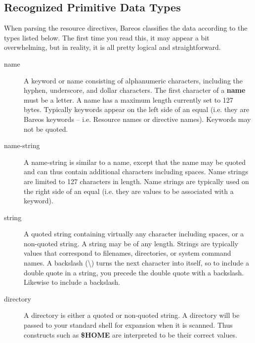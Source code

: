 \subsection{Recognized Primitive Data Types}
\label{DataTypes}

When parsing the resource directives, Bareos classifies the data according to
the types listed below. The first time you read this, it may appear a bit
overwhelming, but in reality, it is all pretty logical and straightforward.

\begin{description}

\item [name]
   A keyword or name consisting of alphanumeric characters, including the
hyphen, underscore, and dollar  characters. The first character of a {\bf
name} must be  a letter.  A name has a maximum length currently set to 127
bytes.  Typically keywords appear on the left side of an equal (i.e.  they are
Bareos keywords -- i.e. Resource names or  directive names). Keywords may not
be quoted.

\item [name-string]
   A name-string is similar to a name,  except that the name may be quoted and
can thus contain  additional characters including spaces. Name strings  are
limited to 127 characters in length. Name strings  are typically used on the
right side of an equal (i.e.  they are values to be associated with a keyword).


\item [string]
   A quoted string containing virtually any  character including spaces, or a
non-quoted string. A  string may be of any length. Strings are typically
values  that correspond to filenames, directories, or system  command names. A
backslash (\textbackslash{}) turns the next character into  itself, so to
include a double quote in a string, you precede the  double quote with a
backslash. Likewise to include a backslash.

\item [directory]
   A directory is either a quoted or  non-quoted string. A directory will be
passed to your  standard shell for expansion when it is scanned. Thus
constructs such as {\bf \$HOME} are interpreted to be  their correct values.


\end{description}
